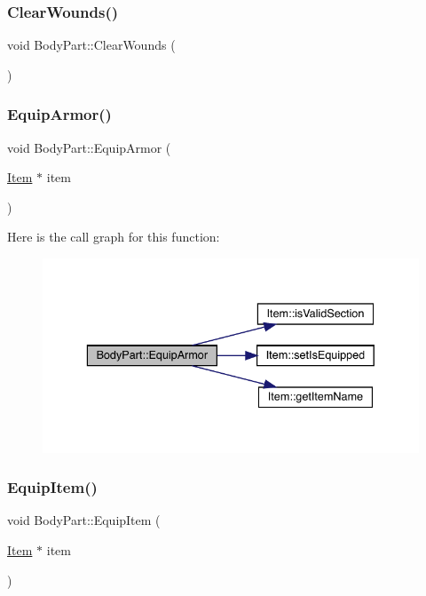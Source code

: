 \subsubsection{\texorpdfstring{Clear\+Wounds()}{ClearWounds()}}
{\footnotesize\ttfamily void Body\+Part\+::\+Clear\+Wounds (\begin{DoxyParamCaption}{ }\end{DoxyParamCaption})}

\mbox{\label{class_body_part_aa12ae5563a19cabd664731bbba3c7ea6}} 
\subsubsection{\texorpdfstring{Equip\+Armor()}{EquipArmor()}}
{\footnotesize\ttfamily void Body\+Part\+::\+Equip\+Armor (\begin{DoxyParamCaption}\item[{\mbox{\hyperlink{class_item}{Item}} $\ast$}]{item }\end{DoxyParamCaption})}

Here is the call graph for this function\+:
\nopagebreak
\begin{figure}[H]
\begin{center}
\leavevmode
\includegraphics[width=336pt]{class_body_part_aa12ae5563a19cabd664731bbba3c7ea6_cgraph}
\end{center}
\end{figure}
\mbox{\label{class_body_part_a33d24af8ecd0eb34d39d54550fc0f604}} 
\subsubsection{\texorpdfstring{Equip\+Item()}{EquipItem()}}
{\footnotesize\ttfamily void Body\+Part\+::\+Equip\+Item (\begin{DoxyParamCaption}\item[{\mbox{\hyperlink{class_item}{Item}} $\ast$}]{item }\end{DoxyParamCaption})}

